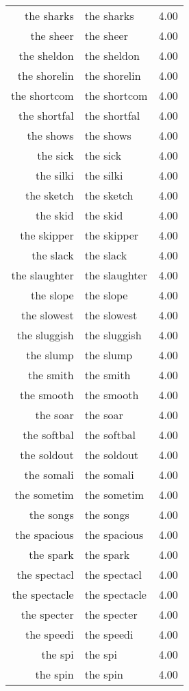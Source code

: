 \begin{table}[ht]
\begin{tabular}{rlr}
  the sharks & the sharks & 4.00 \\ 
  the sheer & the sheer & 4.00 \\ 
  the sheldon & the sheldon & 4.00 \\ 
  the shorelin & the shorelin & 4.00 \\ 
  the shortcom & the shortcom & 4.00 \\ 
  the shortfal & the shortfal & 4.00 \\ 
  the shows & the shows & 4.00 \\ 
  the sick & the sick & 4.00 \\ 
  the silki & the silki & 4.00 \\ 
  the sketch & the sketch & 4.00 \\ 
  the skid & the skid & 4.00 \\ 
  the skipper & the skipper & 4.00 \\ 
  the slack & the slack & 4.00 \\ 
  the slaughter & the slaughter & 4.00 \\ 
  the slope & the slope & 4.00 \\ 
  the slowest & the slowest & 4.00 \\ 
  the sluggish & the sluggish & 4.00 \\ 
  the slump & the slump & 4.00 \\ 
  the smith & the smith & 4.00 \\ 
  the smooth & the smooth & 4.00 \\ 
  the soar & the soar & 4.00 \\ 
  the softbal & the softbal & 4.00 \\ 
  the soldout & the soldout & 4.00 \\ 
  the somali & the somali & 4.00 \\ 
  the sometim & the sometim & 4.00 \\ 
  the songs & the songs & 4.00 \\ 
  the spacious & the spacious & 4.00 \\ 
  the spark & the spark & 4.00 \\ 
  the spectacl & the spectacl & 4.00 \\ 
  the spectacle & the spectacle & 4.00 \\ 
  the specter & the specter & 4.00 \\ 
  the speedi & the speedi & 4.00 \\ 
  the spi & the spi & 4.00 \\ 
  the spin & the spin & 4.00 \\ 

\end{tabular}
\end{table}
